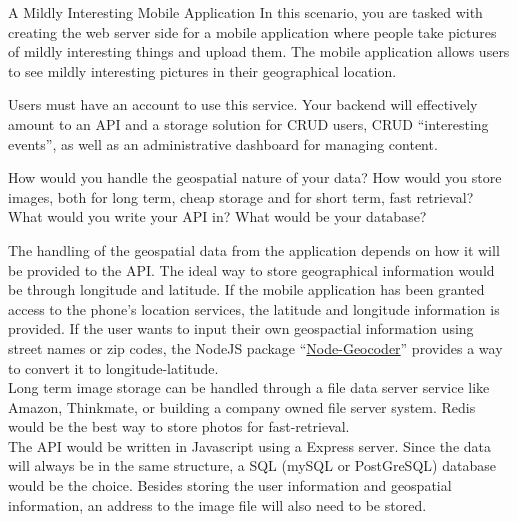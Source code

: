 \documentclass{homework}
\begin{document}
\newpage
\begin{problem}[4]{A Mildly Interesting Mobile Application}
    In this scenario, you are tasked with creating the web server side for a mobile application where people take pictures of mildly interesting things and upload them. The mobile application allows users to see mildly interesting pictures in their geographical location.
    
    \vskip 1mm

    Users must have an account to use this service. Your backend will effectively amount to an API and a storage solution for CRUD users, CRUD ``interesting events'', as well as an administrative dashboard for managing content.
    
    \vskip 1mm

    How would you handle the geospatial nature of your data? How would you store images, both for long term, cheap storage and for short term, fast retrieval? What would you write your API in? What would be your database?
\end{problem}

\begin{solution}

    The handling of the geospatial data from the application depends on how it will be provided to the API. The ideal way to store geographical information would be through longitude and latitude. If the mobile application has been granted access to the phone's location services, the latitude and longitude information is provided. If the user wants to input their own geospactial information using street names or zip codes, the NodeJS package ``\href{https://www.npmjs.com/package/node-geocoder}{Node-Geocoder}'' provides a way to convert it to longitude-latitude. \\

    Long term image storage can be handled through a file data server service like Amazon, Thinkmate, or building a company owned file server system. Redis would be the best way to store photos for fast-retrieval. \\

    The API would be written in Javascript using a Express server. Since the data will always be in the same structure, a SQL (mySQL or PostGreSQL) database would be the choice. Besides storing the user information and geospatial information, an address to the image file will also need to be stored. 
\end{solution}
\end{document}
